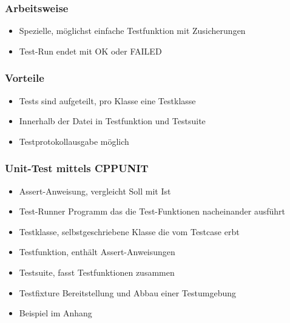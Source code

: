 \subsubsection{Arbeitsweise}
\begin{itemize}
	\item Spezielle, möglichst einfache Testfunktion mit Zusicherungen
	\item Test-Run endet mit OK oder FAILED
\end{itemize}

\subsubsection{Vorteile}
\begin{itemize}
	\item Tests sind aufgeteilt, pro Klasse eine Testklasse
	\item Innerhalb der Datei in Testfunktion und Testsuite
	\item Testprotokollausgabe möglich 
\end{itemize}

\subsubsection{Unit-Test mittels CPPUNIT}
\begin{minipage}{15cm}
	\begin{itemize}
		\item Assert-Anweisung, vergleicht Soll mit Ist
		\item Test-Runner Programm das die Test-Funktionen nacheinander ausführt
		\item Testklasse, selbstgeschriebene Klasse die vom Testcase erbt
		\item Testfunktion, enthält Assert-Anweisungen
		\item Testsuite, fasst Testfunktionen zusammen
		\item Testfixture Bereitstellung und Abbau einer Testumgebung
		\item Beispiel im Anhang
	\end{itemize}
\end{minipage}
